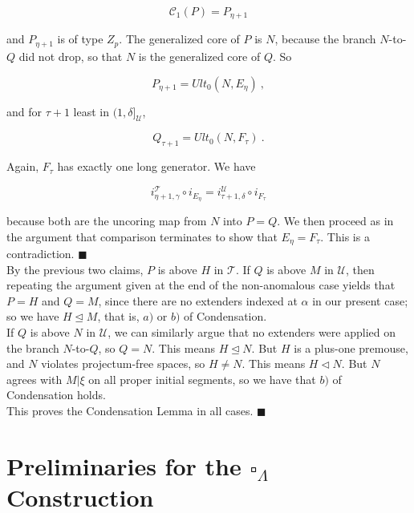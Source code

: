 \documentclass[12pt]{article}
\begin{document}
\[
\mathcal{C}_1 (P) = P_{\eta + 1}
\]

and $P_{\eta + 1}$ is of type $Z_p$.  The generalized core of $P$ is $N$, because the branch $N$-to-$Q$ did not drop, so that $N$ is the generalized core of $Q$.  So

\[
P_{\eta + 1} = Ult_0 (N , E_\eta ) \ ,
\]

and for $\tau + 1$ least in $( 1 , \delta ]_{\mathscr{U}}$,

\[
Q_{\tau + 1} = Ult_0 (N , F_\tau ) \ .
\]

Again, $F_\tau$ has exactly one long generator.  We have

\[
i_{\eta + 1 , \gamma }^{\mathscr{T}} \circ i_{E_\eta} = i_{\tau + 1 , \delta}^{\mathscr{U}} \circ i_{F_\tau }
\]

because both are the uncoring map from $N$ into $P = Q$.  We then proceed as in the argument that comparison terminates to show that $E_\eta = F_\tau$.  This is a contradiction. $\blacksquare$\\

By the previous two claims, $P$  is above $H$ in $\mathscr{T}$.  If $Q$ is above $M$ in $\mathscr{U}$, then repeating the argument given at the end of the non-anomalous case yields that $P = H$ and $Q = M$, since there are no extenders indexed at $\alpha$ in our present case; so we have $H \unlhd M$, that is, $a)$ or $b)$ of Condensation.\\

If $Q$ is above $N$ in $\mathscr{U}$, we can similarly argue that no extenders were applied on the branch $N$-to-$Q$, so $Q = N$.  This means $H \unlhd N$.  But $H$ is a plus-one premouse, and $N$ violates projectum-free spaces, so $H \neq N$.  This means $H \lhd N$.  But $N$ agrees with $M | \xi$ on all proper initial segments, so we have that $b)$ of Condensation holds.\\

This proves the Condensation Lemma in all cases.  $\blacksquare$













\section{Preliminaries for the $\square_\Lambda$ Construction} \label{prelim section}
\end{document}
